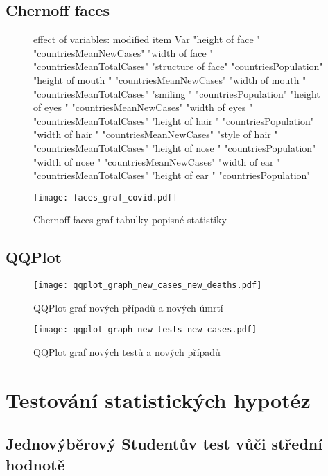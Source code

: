 \documentclass[a4paper]{ article}
\begin{document}
\subsection{Chernoff faces}
\begin{figure}[H]
\centering

\begin{Schunk}
\begin{Soutput}
effect of variables:
 modified item       Var                      
 "height of face   " "countriesMeanNewCases"  
 "width of face    " "countriesMeanTotalCases"
 "structure of face" "countriesPopulation"    
 "height of mouth  " "countriesMeanNewCases"  
 "width of mouth   " "countriesMeanTotalCases"
 "smiling          " "countriesPopulation"    
 "height of eyes   " "countriesMeanNewCases"  
 "width of eyes    " "countriesMeanTotalCases"
 "height of hair   " "countriesPopulation"    
 "width of hair   "  "countriesMeanNewCases"  
 "style of hair   "  "countriesMeanTotalCases"
 "height of nose  "  "countriesPopulation"    
 "width of nose   "  "countriesMeanNewCases"  
 "width of ear    "  "countriesMeanTotalCases"
 "height of ear   "  "countriesPopulation"    
\end{Soutput}
\end{Schunk}
\texttt{[image: faces\_graf\_covid.pdf]}
\caption{Chernoff faces graf tabulky popisné statistiky}
\end{figure}
\clearpage

\subsection{QQPlot}
\begin{figure}[H]
\centering

\texttt{[image: qqplot\_graph\_new\_cases\_new\_deaths.pdf]}
\caption{QQPlot graf nových případů a nových úmrtí}

\texttt{[image: qqplot\_graph\_new\_tests\_new\_cases.pdf]}
\caption{QQPlot graf nových testů a nových případů}

\end{figure}
\clearpage

\section{Testování statistických hypotéz}

\subsection{Jednovýběrový Studentův test vůči střední hodnotě}
\begin{Schunk}
\end{Schunk}
\end{document}
